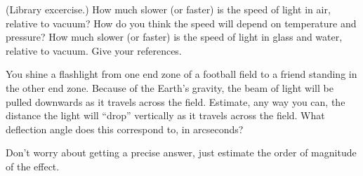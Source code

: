 \begin{problem}
(Library excercise.)  How much slower (or faster) is the speed of
light in air, relative to vacuum?  How do you think the speed will
depend on temperature and pressure?  How much slower (or faster) is
the speed of light in glass and water, relative to vacuum.  Give your
references.
\end{problem}

\begin{problem}
You shine a flashlight from one end zone of a football field to a
friend standing in the other end zone.  Because of the Earth's
gravity, the beam of light will be pulled downwards as it travels
across the field.  Estimate, any way you can, the distance the light
will ``drop'' vertically as it travels across the field.  What
deflection angle does this correspond to, in arcseconds?
\end{problem}

Don't worry about getting a precise answer, just estimate the order of
magnitude of the effect.
